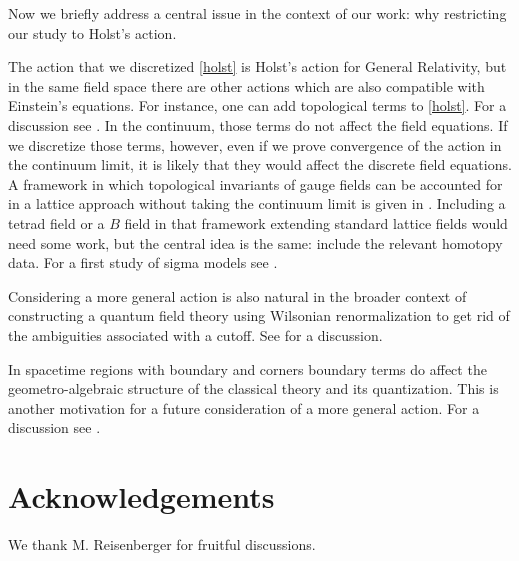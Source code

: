 \documentclass{article}
\begin{document}
Now we briefly address a central issue in the context of our work: why restricting our study to Holst's action. 

The action that we discretized \eqref{holst} is Holst's action for General Relativity, but in the same field space there are other actions which are also compatible with Einstein's equations. For instance, one can add topological terms to \eqref{holst}. For a discussion see \cite{AddingTopologicalTerms}. In the continuum, those terms do not affect the field equations. If we discretize those terms, however, even if we prove convergence of the action in the continuum limit, it is likely that they would affect the discrete field equations. A framework in which topological invariants of gauge fields can be accounted for in a lattice approach without taking the continuum limit is given in \cite{Zapata-Meneses}. 
Including a tetrad field or a $B$ field in that framework extending standard lattice fields would need some work, but the central idea is the same: include the relevant homotopy data. For a first study of sigma models see \cite{Dall'Olio-Zapata}. 


Considering a more general action is also natural in the broader context of constructing a quantum field theory using Wilsonian renormalization to get rid of the ambiguities associated with a cutoff. See \cite{AddingTopologicalTerms} for a discussion. 

In spacetime regions with boundary and corners boundary terms do affect the geometro-algebraic structure of the classical theory and its quantization. This is another motivation for a future consideration of a more general action. For a discussion see \cite{ReviewCornerModesETC}. 







\section*{Acknowledgements}
	We thank M. Reisenberger for fruitful discussions. 
	
	

	\medskip
\end{document}
